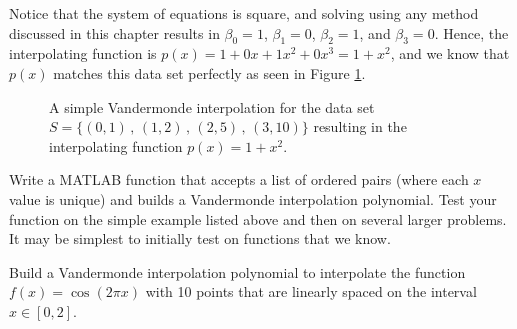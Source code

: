 Notice that the system of equations is square, and solving using any method discussed in
this chapter results in $\beta_0 = 1$, $\beta_1 = 0$, $\beta_2 = 1$, and $\beta_3 = 0$.
Hence, the interpolating function is $p(x) = 1 + 0x + 1x^2 + 0x^3 = 1+x^2$, and we know
that $p(x)$ matches this data set perfectly as seen in Figure \ref{fig:vandermonde}.

\begin{figure}[ht!]
    \begin{center}
    \end{center}
    \caption{A simple Vandermonde interpolation for the data set $S = \{(0,1) \, , \,
(1,2) \, , \, (2,5) \, , \, (3,10) \}$ resulting in the interpolating function $p(x) =
1+x^2$.}
    \label{fig:vandermonde}
\end{figure}


\begin{problem}\label{prob:vandermonde_1}
   Write a MATLAB function that accepts a list of ordered pairs (where each $x$ value is
   unique) and builds a Vandermonde interpolation polynomial.  Test your function on the
   simple example listed above and then on several larger problems.  It may be simplest to
   initially test on functions that we know.
\end{problem}

\begin{problem}
    Build a Vandermonde interpolation polynomial to interpolate the function $f(x) =
    \cos(2 \pi x)$ with 10 points that are linearly spaced on the interval $x \in [0,2]$.
\end{problem}

